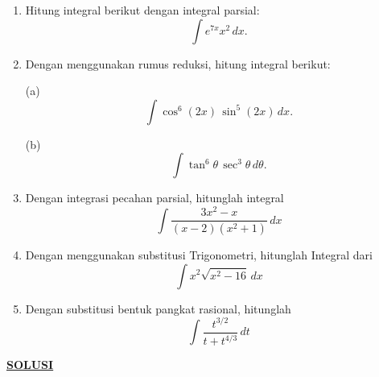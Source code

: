 \documentclass[a4paper,12pt]{article}
\begin{document}
\begin{enumerate}
  \item Hitung integral berikut dengan integral parsial:
        \[
          \int e^{7x}x^2\,dx.
        \]

  \item Dengan menggunakan rumus reduksi, hitung integral berikut:

        \hspace*{1.4em}(a)
        \[
          \int \cos^6(2x)\,\sin^5(2x)\,dx.
        \]

        \hspace*{1.4em}(b)
        \[
          \int \tan^6\theta\,\sec^3\theta\,d\theta.
        \]

  \item Dengan integrasi pecahan parsial, hitunglah integral
        \[
          \int \frac{3x^2-x}{(x-2)(x^2+1)}\,dx
        \]

  \item Dengan menggunakan substitusi Trigonometri, hitunglah Integral dari
        \[
          \int x^2\sqrt{x^2-16}\,dx
        \]

  \item Dengan substitusi bentuk pangkat rasional, hitunglah
        \[
          \int \frac{t^{3/2}}{t+t^{4/3}}\,dt
        \]

\end{enumerate}
\newpage
\begin{center}
  {\Large \textbf{\underline{ SOLUSI }}}
\end{center}
\end{document}
